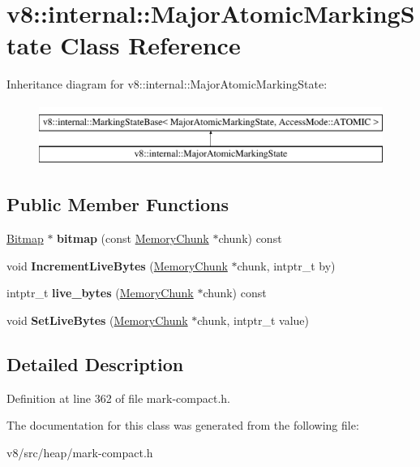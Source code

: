 \hypertarget{classv8_1_1internal_1_1MajorAtomicMarkingState}{}\section{v8\+:\+:internal\+:\+:Major\+Atomic\+Marking\+State Class Reference}
\label{classv8_1_1internal_1_1MajorAtomicMarkingState}
Inheritance diagram for v8\+:\+:internal\+:\+:Major\+Atomic\+Marking\+State\+:\begin{figure}[H]
\begin{center}
\leavevmode
\includegraphics[height=2.000000cm]{classv8_1_1internal_1_1MajorAtomicMarkingState}
\end{center}
\end{figure}
\subsection*{Public Member Functions}
\begin{DoxyCompactItemize}
\item 
\mbox{\label{classv8_1_1internal_1_1MajorAtomicMarkingState_a6a7239ef4bdb30a774e14304340acbe0}} 
\mbox{\hyperlink{classv8_1_1internal_1_1Bitmap}{Bitmap}} $\ast$ {\bfseries bitmap} (const \mbox{\hyperlink{classv8_1_1internal_1_1MemoryChunk}{Memory\+Chunk}} $\ast$chunk) const
\item 
\mbox{\label{classv8_1_1internal_1_1MajorAtomicMarkingState_afc5749b526a23fee9c8ece8848f4ad55}} 
void {\bfseries Increment\+Live\+Bytes} (\mbox{\hyperlink{classv8_1_1internal_1_1MemoryChunk}{Memory\+Chunk}} $\ast$chunk, intptr\+\_\+t by)
\item 
\mbox{\label{classv8_1_1internal_1_1MajorAtomicMarkingState_a1cc85f46a4e73da45fd3c47a9372525b}} 
intptr\+\_\+t {\bfseries live\+\_\+bytes} (\mbox{\hyperlink{classv8_1_1internal_1_1MemoryChunk}{Memory\+Chunk}} $\ast$chunk) const
\item 
\mbox{\label{classv8_1_1internal_1_1MajorAtomicMarkingState_a9ec071e4561609b51a02ad9cb67b4690}} 
void {\bfseries Set\+Live\+Bytes} (\mbox{\hyperlink{classv8_1_1internal_1_1MemoryChunk}{Memory\+Chunk}} $\ast$chunk, intptr\+\_\+t value)
\end{DoxyCompactItemize}


\subsection{Detailed Description}


Definition at line 362 of file mark-\/compact.\+h.



The documentation for this class was generated from the following file\+:\begin{DoxyCompactItemize}
\item 
v8/src/heap/mark-\/compact.\+h\end{DoxyCompactItemize}
